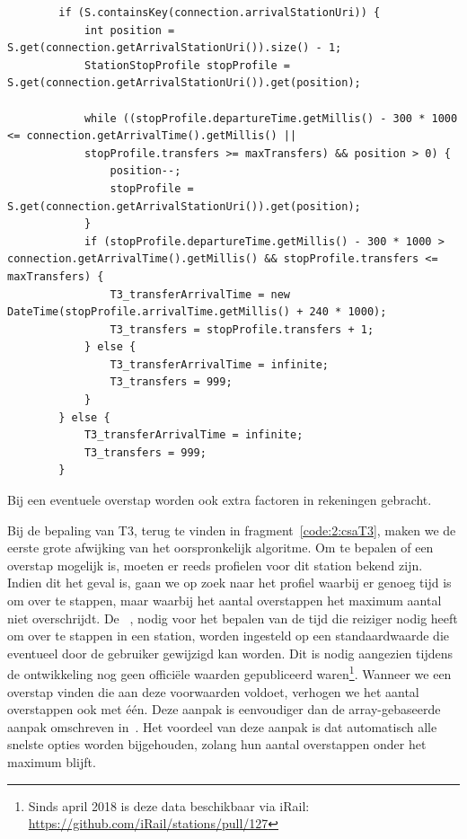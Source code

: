 \begin{listing}[htb]
	\begin{verbatim}
		if (S.containsKey(connection.arrivalStationUri)) {
			int position = S.get(connection.getArrivalStationUri()).size() - 1;
			StationStopProfile stopProfile = S.get(connection.getArrivalStationUri()).get(position);
			
			while ((stopProfile.departureTime.getMillis() - 300 * 1000 <= connection.getArrivalTime().getMillis() ||
			stopProfile.transfers >= maxTransfers) && position > 0) {
				position--;
				stopProfile = S.get(connection.getArrivalStationUri()).get(position);
			}
			if (stopProfile.departureTime.getMillis() - 300 * 1000 > connection.getArrivalTime().getMillis() && stopProfile.transfers <= maxTransfers) {
				T3_transferArrivalTime = new DateTime(stopProfile.arrivalTime.getMillis() + 240 * 1000);
				T3_transfers = stopProfile.transfers + 1;
			} else {
				T3_transferArrivalTime = infinite;
				T3_transfers = 999;
			}
		} else {
			T3_transferArrivalTime = infinite;
			T3_transfers = 999;
		}
		\end{verbatim}
		\caption[CSA: Bepalen van aankomsttijden]{Bij een eventuele overstap worden ook extra factoren in rekeningen gebracht.}
		\label{code:2:csaT3}
\end{listing}

Bij de bepaling van T3, terug te vinden in fragment~\ref{code:2:csaT3}, maken we de eerste grote afwijking van het oorspronkelijk algoritme. Om te bepalen of een overstap mogelijk is, moeten er reeds profielen voor dit station bekend zijn. Indien dit het geval is, gaan we op zoek naar het profiel waarbij er genoeg tijd is om over te stappen, maar waarbij het aantal overstappen het maximum aantal niet overschrijdt. 
De ~\citep{strasser17,hannemann08}, nodig voor het bepalen van de tijd die reiziger nodig heeft om over te stappen in een station, worden ingesteld op een standaardwaarde die eventueel door de gebruiker gewijzigd kan worden. Dit is nodig aangezien tijdens de ontwikkeling nog geen officiële waarden gepubliceerd waren\footnote{Sinds april 2018 is deze data beschikbaar via iRail: \url{https://github.com/iRail/stations/pull/127}}. 
Wanneer we een overstap vinden die aan deze voorwaarden voldoet, verhogen we het aantal overstappen ook met één. Deze aanpak is eenvoudiger dan de array-gebaseerde aanpak omschreven in~\cite{strasser17}. Het voordeel van deze aanpak is dat automatisch alle snelste opties worden bijgehouden, zolang hun aantal overstappen onder het maximum blijft. 


